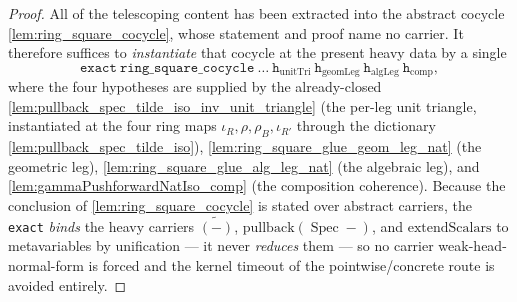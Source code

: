 \begin{lemma}
\begin{proof}
    All of the telescoping content has been extracted into the abstract cocycle
    \cref{lem:ring_square_cocycle}, whose statement and proof name no carrier. It therefore suffices to
    \emph{instantiate} that cocycle at the present heavy data by a single
    \[
      \mathtt{exact\ ring\_square\_cocycle\ \dots\ h_{\mathrm{unitTri}}\ h_{\mathrm{geomLeg}}\
        h_{\mathrm{algLeg}}\ h_{\mathrm{comp}}},
    \]
    where the four hypotheses are supplied by the already-closed
    \cref{lem:pullback_spec_tilde_iso_inv_unit_triangle} (the per-leg unit triangle, instantiated at the
    four ring maps \(\iota_R,\rho,\rho_B,\iota_{R'}\) through the dictionary
    \cref{lem:pullback_spec_tilde_iso}), \cref{lem:ring_square_glue_geom_leg_nat} (the geometric leg),
    \cref{lem:ring_square_glue_alg_leg_nat} (the algebraic leg), and
    \cref{lem:gammaPushforwardNatIso_comp} (the composition coherence). Because the conclusion of
    \cref{lem:ring_square_cocycle} is stated over abstract carriers, the \texttt{exact} \emph{binds} the
    heavy carriers \(\widetilde{(-)}\), \(\mathrm{pullback}(\operatorname{Spec}-)\), and
    \(\mathrm{extendScalars}\) to metavariables by unification --- it never \emph{reduces} them --- so no
    carrier weak-head-normal-form is forced and the kernel timeout of the pointwise/concrete route is
    avoided entirely.
  \end{proof}
\end{lemma}

